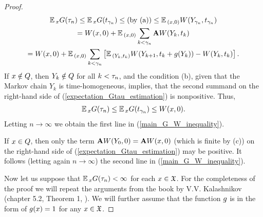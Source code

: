 \begin{proof}
		\begin{gather}
		\operatorname*{\mathbb{E}}{}_{x}G(\tau_{n}) \leq \operatorname*{\mathbb{E}}{}_{x}G(t_{\gamma_{n}}) \leq \text{(by (a))} \leq \operatorname*{\mathbb{E}}{}_{(x, 0)}W(Y_{\gamma_{n}}, t_{\gamma_{n}}) \notag \notag\\ = W(x, 0) + \operatorname*{\mathbb{E}}{}_{(x, 0)}\sum_{k < \gamma_{n}}\mathbf{A}W(Y_{k}, t_{k}) \notag\\ = W(x, 0) + \operatorname*{\mathbb{E}}{}_{(x, 0)}\sum_{k < \gamma_{n}}\left[\operatorname*{\mathbb{E}}{}_{(Y_{k}, t_{k})}W(Y_{k+1}, t_{k}+g(Y_{k})) - W(Y_{k}, t_{k})\right].
		\label{expectation_Gtau_estimation}
		\end{gather}
		If $x \notin Q$, then $Y_{k} \notin Q$ for all $k < \tau_{n}$, and the condition (b), given that the Markov chain $Y_{k}$ is time-homogeneous, implies, that the second summand on the right-hand side of (\ref{expectation_Gtau_estimation}) is nonpositive. Thus,
		\begin{gather*}
		\operatorname*{\mathbb{E}}{}_{x}G(\tau_{n}) \leq \operatorname*{\mathbb{E}}{}_{x}G(t_{\gamma_{n}}) \leq W(x, 0).
		\end{gather*}
		Letting $n \xrightarrow{} \infty$ we obtain the first line in (\ref{main_G_W_inequality}).
		
		If $x \in Q$, then only the term $\mathbf{A}W(Y_{0}, 0) = \mathbf{A}W(x, 0)$ (which is finite by (c)) on the right-hand side of (\ref{expectation_Gtau_estimation}) may be positive. It follows (letting again $n \xrightarrow{} \infty$) the second line in (\ref{main_G_W_inequality}).
		
		Now let us suppose that $\operatorname*{\mathbb{E}}{}_{x}G(\tau_{n}) < \infty$ for each $x \in \mathfrak{X}$. For the completeness of the proof we will repeat the arguments from the book by V.V. Kalashnikov (chapter 5.2, Theorem 1, \cite{Kalashnikov}). We will further assume that the function $g$ is in the form of $g(x) = 1$ for any $x \in \mathfrak{X}$.
		

\end{proof}
